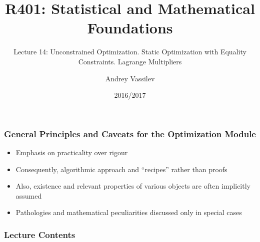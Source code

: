 \documentclass[10pt]{beamer}
\title{R401: Statistical and Mathematical Foundations}
\subtitle{Lecture 14: Unconstrained Optimization. Static Optimization with Equality Constraints. Lagrange Multipliers}
\author{Andrey Vassilev}
\date{2016/2017}
\theoremstyle{definition}
\begin{document}
\maketitle

\begin{frame}[fragile]
\frametitle{General Principles and Caveats for the Optimization Module}
\begin{itemize}
\item Emphasis on practicality over rigour
\item Consequently, algorithmic approach and ``recipes'' rather than proofs
\item Also, existence and relevant properties of various objects are often implicitly assumed
\item Pathologies and mathematical peculiarities discussed only in special cases
\end{itemize}
\end{frame}

\begin{frame}[fragile]
\frametitle{Lecture Contents}
\tableofcontents
\end{frame}
\end{document}
